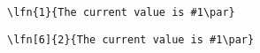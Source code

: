 \documentclass{article}
\begin{document}
\verb|\lfn{1}{The current value is #1\par}|


\bigskip

\verb|\lfn[6]{2}{The current value is #1\par}|

\end{document}
